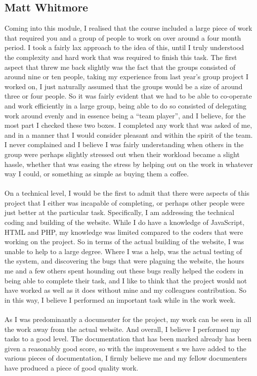\documentclass{project}
\begin{document}
\subsection{Matt Whitmore}
Coming into this module, I realised that the course included a large piece of work that required you and a group of people to work on over around a four month period. I took a fairly lax approach to the idea of this, until I truly understood the complexity and hard work that was required to finish this task. The first aspect that threw me back slightly was the fact that the groups consisted of around nine or ten people, taking my experience from last year’s group project I worked on, I just naturally assumed that the groups would be a size of around three or four people. So it was fairly evident that we had to be able to co-operate and work efficiently in a large group, being able to do so consisted of delegating work around evenly and in essence being a “team player”, and I believe, for the most part I checked these two boxes. I completed any work that was asked of me, and in a manner that I would consider pleasant and within the spirit of the team. I never complained and I believe I was fairly understanding when others in the group were perhaps slightly stressed out when their workload became a slight hassle, whether that was easing the stress by helping out on the work in whatever way I could, or something as simple as buying them a coffee.
\\\\
On a technical level, I would be the first to admit that there were aspects of this project that I either was incapable of completing, or perhaps other people were just better at the particular task. Specifically, I am addressing the technical coding and building of the website. While I do have a knowledge of JavaScript, HTML and PHP, my knowledge was limited compared to the coders that were working on the project. So in terms of the actual building of the website, I was unable to help to a large degree. Where I was a help, was the actual testing of the system, and discovering the bugs that were plaguing the website, the hours me and a few others spent hounding out these bugs really helped the coders in being able to complete their task, and I like to think that the project would not have worked as well as it does without mine and my colleagues contribution. So in this way, I believe I performed an important task while in the work week.
\\\\
As I was predominantly a documenter for the project, my work can be seen in all the work away from the actual website. And overall, I believe I performed my tasks to a good level. The documentation that has been marked already has been given a reasonably good score, so with the improvement s we have added to the various pieces of documentation, I firmly believe me and my fellow documenters have produced a piece of good quality work.
\end{document}
